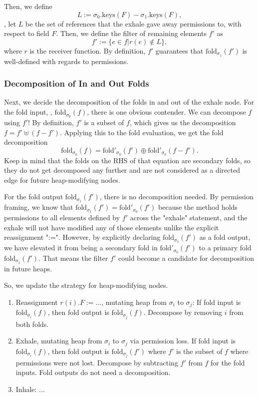 \documentclass[msc,oneside]{ubcthesis}
\begin{document}
Then, we define 
$$L := \sigma_0.\textrm{keys}(F) - \sigma_1.\textrm{keys}(F),$$
\ie, let $L$ be the set of references that the exhale gave away permissions to, with respect to field $F$. Then, we define the filter of remaining elements $f'$ as
$$f' := \{e \in f | r(e) \not\in L \},$$ where $r$ is the receiver function. By definition, $f'$ guarantees that $\textrm{fold}_{\sigma_1}(f')$ is well-defined with regards to permissions. 

\subsubsection{Decomposition of In and Out Folds}
Next, we decide the decomposition of the folds in and out of the exhale node. For the fold input, \ie, $\textrm{fold}_{\sigma_0}(f)$,  there is one obvious contender. We can decompose $f$ using $f'$! By definition,  $f'$ is a subset of $f$, which gives us the decomposition $f = f' \uplus (f-f')$. Applying this to the fold evaluation, we get the fold decomposition
$$\textrm{fold}_{\sigma_0}(f) = \textrm{fold}'_{\sigma_0}(f') \oplus \textrm{fold}'_{\sigma_0}(f - f').$$ Keep in mind that the folds on the RHS of that equation are secondary folds, so they do not get decomposed any further and are not considered as a directed edge for future heap-modifying nodes.

For the fold output $\textrm{fold}_{\sigma_1}(f')$, there is no decomposition needed. By permission framing, we know that $\textrm{fold}_{\sigma_1}(f') = \textrm{fold}'_{\sigma_0}(f')$ because the method holds permissions to all elements defined by $f'$ across the "exhale" statement, and the exhale will not have modified any of those elements unlike the explicit reassignment ":=". However, by explicitly declaring $\textrm{fold}_{\sigma_1}(f')$ as a fold output, we have elevated it from being a secondary fold in $\textrm{fold}'_{\sigma_0}(f')$ to a primary fold $\textrm{fold}_{\sigma_1}(f')$. That means the filter $f'$ could become a candidate for decomposition in future heaps.

So, we update the strategy for heap-modifying nodes.
\begin{enumerate}
    \item Reassignment $r(i).F := ...$, mutating heap from $\sigma_i$ to $\sigma_j$: 
    If fold input is $\textrm{fold}_{\sigma_i}(f)$, then fold output is $\textrm{fold}_{\sigma_j}(f)$. 
    Decompose by removing $i$ from both folds.
    \item Exhale, mutating heap from $\sigma_i$ to $\sigma_j$ via permission loss. If fold input is $\textrm{fold}_{\sigma_i}(f)$, then fold output is $\textrm{fold}_{\sigma_j}(f')$ where $f'$ is the subset of $f$ where permissions were not lost. Decompose by subtracting $f'$ from $f$ for the fold inputs. Fold outputs do not need a decomposition.
    \item Inhale: ...
\end{enumerate}
\end{document}

